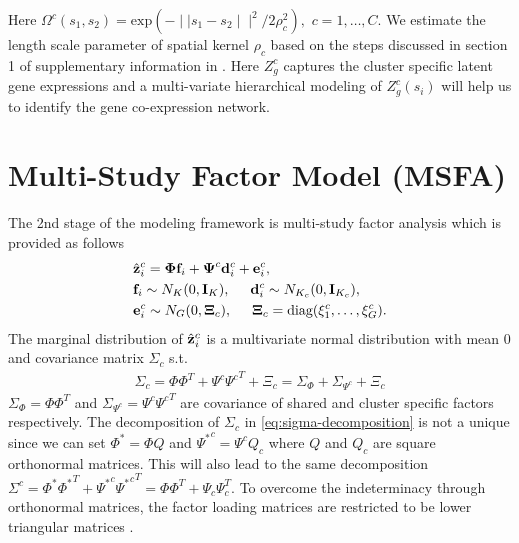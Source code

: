 \documentclass[
]{book}
\begin{document}
Here \(\Omega^{c}(s_{1}, s_{2}) = \text{exp} (- \mid \mid s_{1} - s_{2} \mid \mid^{2} / 2 \rho^{2}_{c} ),\) \(c = 1, \dots, C\). We estimate the length scale parameter of spatial kernel \(\rho_{c}\) based on the steps discussed in section 1 of supplementary information in \citet{sun2017differential}. Here \(Z^{c}_{g}\) captures the cluster specific latent gene expressions and a multi-variate hierarchical modeling of \(Z^{c}_{g}(s_{i})\) will help us to identify the gene co-expression network.

\hypertarget{multi-study-factor-model-msfa}{%
\section{Multi-Study Factor Model (MSFA)}\label{multi-study-factor-model-msfa}}

The 2nd stage of the modeling framework is multi-study factor analysis \citep{de2018bayesian} which is provided as follows
\begin{align}
\begin{split}
& \hat{\bf z}^{c}_{i} = \boldsymbol \Phi {\bf f}_{i} + \boldsymbol \Psi^{c} {\bf d}^{c}_{i} + {\bf e}^{c}_{i}, \\
& {\bf f}_{i} \sim N_{K}(0, {\bf I}_{K}), \hspace{0.5cm} {\bf d}^{c}_{i} \sim N_{K_{c}}(0,{\bf I}_{K_{c}}),\\
& {\bf e}^{c}_{i} \sim N_{G}(0,\boldsymbol \Xi_{c}), \hspace{0.5cm} \boldsymbol \Xi_{c} = \text{diag}(\xi^{c}_{1}, \dots, \xi^{c}_{G} ).
\end{split}
\label{eq:MSFA-supp}
\end{align}
The marginal distribution of \(\hat{\bf z}^{c}_{i}\) is a multivariate normal distribution with mean \(0\) and covariance matrix \(\Sigma_{c}\) s.t.
\begin{align}
\Sigma_{c} = \Phi \Phi^{T} + \Psi^{c} {\Psi^{c}}^{T} + \Xi_{c} = \Sigma_{\Phi} + \Sigma_{\Psi^{c}} + \Xi_{c}
\label{eq:sigma-decomposition}
\end{align}
\(\Sigma_{\Phi} = \Phi \Phi^{T}\) and \(\Sigma_{\Psi^{c}} = \Psi^{c} {\Psi^{c}}^{T}\) are covariance of shared and cluster specific factors respectively. The decomposition of \(\Sigma_{c}\) in \eqref{eq:sigma-decomposition} is not a unique since we can set \(\Phi^{*} = \Phi Q\) and \({\Psi^{*}}^{c} = \Psi^{c} Q_{c}\) where \(Q\) and \(Q_{c}\) are square orthonormal matrices. This will also lead to the same decomposition \(\Sigma^{c} = \Phi^{*} {\Phi^{*}}^{T} + {\Psi^{*}}^{c} {{\Psi^{*}}^{c}}^{T} = \Phi \Phi^{T} + \Psi_{c} \Psi_{c}^{T}\). To overcome the indeterminacy through orthonormal matrices, the factor loading matrices are restricted to be lower triangular matrices \citep{geweke1996measuring, lopes2004bayesian}.
\end{document}
